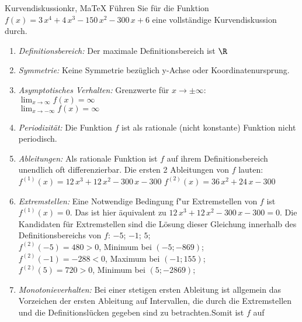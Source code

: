  \providecommand{\MoIl}{(} 
 \providecommand{\MoIr}{)}
 \providecommand{\MIntvlSep}{;} 
 \providecommand{\MElSetSep}{;} 
 \begin{MAufgabe}{Kurvendiskussion}{kr, MaTeX}
 F\"uhren Sie f\"ur die Funktion $f(x)=3\, x^4 + 4\, x^3 - 150\, x^2 - 300\, x + 6$ eine vollst\"andige Kurvendiskussion durch.\\ 
 \ifLsg\Loesung
 \begin{enumerate}
 \item \emph{Definitionsbereich:} 
 Der maximale Definitionsbereich ist $\R$\item \emph{Symmetrie:} 
 Keine Symmetrie bez\"uglich y-Achse oder Koordinatenursprung.\item \emph{Asymptotisches Verhalten:} 
 Grenzwerte f\"ur $x\rightarrow \pm \infty$: \\ 
 $\lim_{x\rightarrow \infty} f(x)=\infty$ \\ 
 $\lim_{x\rightarrow -\infty} f(x)=\infty$ \\ 
 \item \emph{Periodizit\"at:} 
 Die Funktion $f$ ist als rationale (nicht konstante) Funktion nicht periodisch.\item \emph{Ableitungen:} 
 Als rationale Funktion ist $f$ auf ihrem Definitionsbereich unendlich oft differenzierbar. 
 Die ersten 2 Ableitungen von $f$ lauten: \\ 
 $f^{(1)}(x)=12\, x^3 + 12\, x^2 - 300\, x - 300$\newline 
  $f^{(2)}(x)=36\, x^2 + 24\, x - 300$\newline 
  \item \emph{Extremstellen:} 
 Eine Notwendige Bedingung f"ur Extremstellen von $f$ ist $f^{(1)}(x)=0$. 
 Das ist hier \"aquivalent zu $12\, x^3 + 12\, x^2 - 300\, x - 300=0$. 
 Die Kandidaten f\"ur Extremstellen sind die L\"osung dieser Gleichung innerhalb des Definitionsbereichs von $f$: $-5$; $-1$; $5$; \\ 
 $f^{(2)}(-5)=480$$>0$, Minimum bei $(-5;-869)$; \\ 
 $f^{(2)}(-1)=-288$$<0$, Maximum bei $(-1;155)$; \\ 
 $f^{(2)}(5)=720$$>0$, Minimum bei $(5;-2869)$; \\ 
 \item \emph{Monotonieverhalten:} 
 Bei einer stetigen ersten Ableitung ist allgemein das Vorzeichen der ersten Ableitung auf Intervallen, die durch die Extremstellen und die Definitionsl\"ucken gegeben sind zu betrachten.Somit ist $f$ auf \\ 
$$
\end{enumerate}
\end{MAufgabe}
